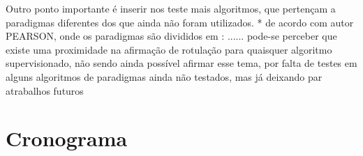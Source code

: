 Outro ponto importante é inserir nos teste mais algoritmos, que pertençam a  paradigmas diferentes dos que ainda não foram utilizados. * de acordo com autor PEARSON, onde os paradigmas são divididos em :  ...... pode-se perceber que existe uma proximidade na afirmação de rotulação para quaisquer algoritmo supervisionado, não sendo ainda possível afirmar esse tema, por falta de testes em alguns algoritmos de paradigmas ainda não testados, mas já deixando par atrabalhos futuros



\section{Cronograma}\label{cap:cron}

\begin{table}[!htbp]
\caption{Cronograma de atividades}     %
\begin{center}


\end{center}
\label{cronograma} %
\end{table}


